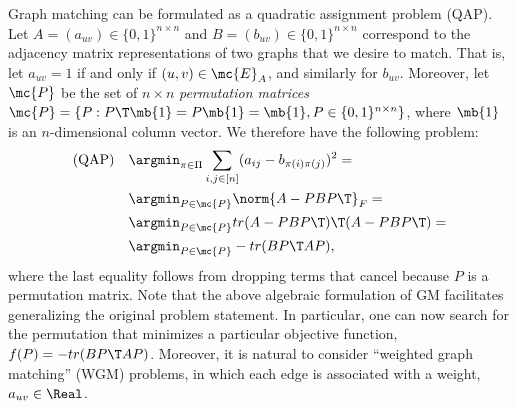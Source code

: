 \documentclass[10pt,journal,cspaper,compsoc]{IEEEtran}
\newcommand{\PmcP}{P \in \mc{P}}
\begin{document}
Graph matching can be formulated as a quadratic assignment problem (QAP).  Let $A=(a_{uv}) \in \{0,1\}^{n \times n}$ and $B=(b_{uv}) \in \{0,1\}^{n \times n}$ correspond to the adjacency matrix representations of two graphs that we desire to match. That is, let $a_{uv}=1$ if and only if $(u,v) \in \mc{E}_A$, and similarly for $b_{uv}$.  Moreover, let $\mc{P}$ be the set of  $n \times n$ \emph{permutation matrices}  $\mc{P}=\{P : P\T \mb{1} = P \mb{1} = \mb{1}, P \in \{0,1\}^{n \times n}\}$, where $\mb{1}$ is an $n$-dimensional column vector.
% 
We therefore have the following problem:  
\begin{subequations} \label{eq:GM}
\begin{align}
\text{(QAP)} \quad 	&\argmin_{\pi \in \Pi} \sum_{i,j \in [n]} (a_{ij} - b_{\pi(i) \pi(j)})^2= \\
	&\argmin_{\PmcP} \norm{A - PBP\T}_F = \\
	&\argmin_{\PmcP} tr(A - PBP\T)\T (A - PBP\T) = \\
	&\argmin_{\PmcP} - tr(B P\T AP), \label{eq:trQAP} %
\end{align}
\end{subequations}
where the last equality follows from dropping terms that cancel because $P$ is a permutation matrix. Note that the above algebraic formulation of GM facilitates generalizing the original problem statement. In particular, one can now search for the permutation that minimizes a particular objective function, $f(P)=- tr(B P\T AP)$.  Moreover, it is natural to consider ``weighted graph matching'' (WGM) problems, in which each edge is associated with a weight, $a_{uv} \in \Real$.  
\end{document}

